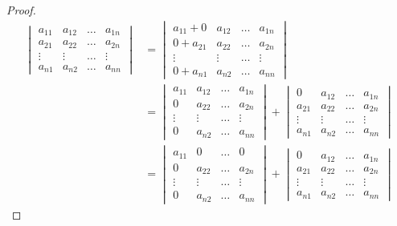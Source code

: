 \documentclass[leqno,autodetect-engine,dvipdfmx-if-dvi,ja=standard,a4paper,12pt]{bxjsbook}
\begin{document}
					\begin{proof}
						\begin{align}
							\begin{vmatrix}
								a_{1 1} & a_{1 2} & \dots & a_{1 n} \\
								a_{2 1} & a_{2 2} & \dots & a_{2 n} \\
								\vdots & \vdots & \dots & \vdots \\
								a_{n 1} & a_{n 2} & \dots & a_{n n}
							\end{vmatrix}
							&= \begin{vmatrix}
								a_{1 1} + 0 & a_{1 2} & \dots & a_{1 n} \\
								0 + a_{2 1} & a_{2 2} & \dots & a_{2 n} \\
								\vdots & \vdots & \dots & \vdots \\
								0 + a_{n 1} & a_{n 2} & \dots & a_{n n}
							\end{vmatrix} \\
							&= \begin{vmatrix}
								a_{1 1} & a_{1 2} & \dots & a_{1 n} \\
								0  & a_{2 2} & \dots & a_{2 n} \\
								\vdots & \vdots & \dots & \vdots \\
								0 & a_{n 2} & \dots & a_{n n}
							\end{vmatrix} 
							+
							\begin{vmatrix}
								0 & a_{1 2} & \dots & a_{1 n} \\
								a_{2 1} & a_{2 2} & \dots & a_{2 n} \\
								\vdots & \vdots & \dots & \vdots \\
								a_{n 1} & a_{n 2} & \dots & a_{n n}
							\end{vmatrix} \\
							&= \begin{vmatrix}
								a_{1 1} & 0 & \dots & 0 \\
								0  & a_{2 2} & \dots & a_{2 n} \\
								\vdots & \vdots & \dots & \vdots \\
								0 & a_{n 2} & \dots & a_{n n}
							\end{vmatrix} 
							+
							\begin{vmatrix}
								0 & a_{1 2} & \dots & a_{1 n} \\
								a_{2 1} & a_{2 2} & \dots & a_{2 n} \\
								\vdots & \vdots & \dots & \vdots \\
								a_{n 1} & a_{n 2} & \dots & a_{n n}
							\end{vmatrix}
						\end{align}
					

\end{proof}
\end{document}
